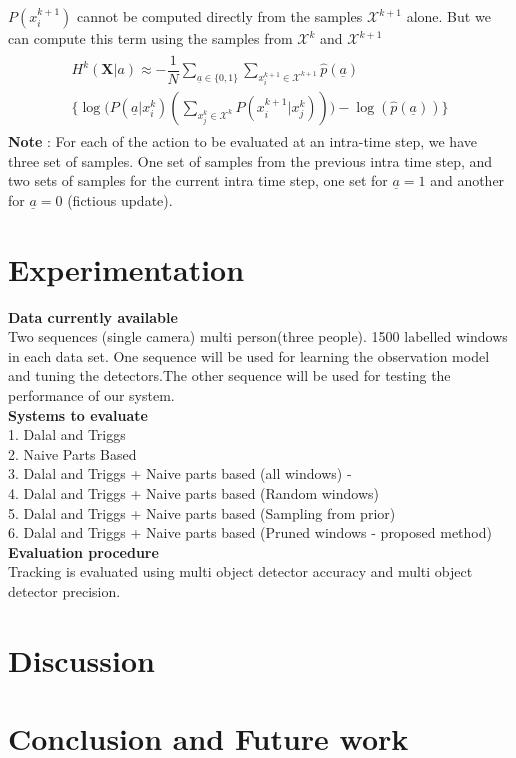 \documentclass[10pt,twocolumn,letterpaper]{article}
\begin{document}
$P(x^{k+1}_{i})$ cannot be computed directly from the samples $\mathcal{X}^{k+1}$ alone. But we can compute this term using the samples from $\mathcal{X}^{k}$ and $\mathcal{X}^{k+1}$
\begin{align}
\begin{split}
H^{k}(\textbf{X}| a)\approx -\dfrac{1}{N}\sum_{\underline{a}\in\lbrace 0 ,1 \rbrace} \sum_{x_{i}^{k+1}\in\mathcal{X}^{k+1}} \widehat{p}( \underline{a}) \\ \Big\lbrace\log\Big(P( \underline{a}|x^{k}_{i})(\sum_{x_{j}^{k}\in\mathcal{X}^{k}}P(x^{k+1}_{i}|x^{k}_{j}))\Big) - \log(\widehat{p}( \underline{a}))\Big\rbrace
\end{split}
\end{align}
\textbf{Note} :
For each of the action to be evaluated at an intra-time step, we have three set of samples. One set of samples from the previous intra time step, and two sets of samples for the current intra time step, one set for $\underline{a}=1$ and another for $\underline{a}=0$ (fictious update).
  
\section{Experimentation}\label{sec:exp}

\textbf{Data currently available}\\ 
Two sequences (single camera) multi person(three people). 1500 labelled windows in each data set. One sequence will be used for learning the observation model and tuning the detectors.The other sequence will be used for testing the performance of our system.\\

\textbf{Systems to evaluate}\\
1. Dalal and Triggs\\ 
2. Naive Parts Based\\ 
3. Dalal and Triggs + Naive parts based (all windows) - \\
4. Dalal and Triggs + Naive parts based (Random windows)\\
5. Dalal and Triggs + Naive parts based (Sampling from prior)\\
6. Dalal and Triggs + Naive parts based (Pruned windows - proposed method)\\
 

\textbf{Evaluation procedure}\\
Tracking is evaluated using multi object detector accuracy and multi object detector precision.

\section{Discussion}
\section{Conclusion and Future work}
{\small


}
\end{document}
